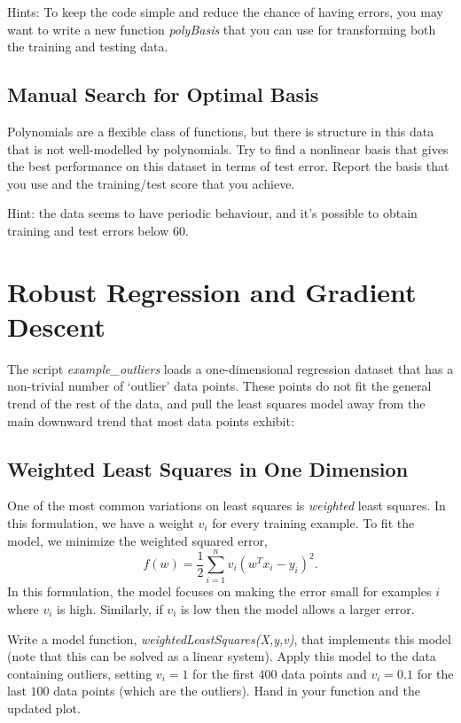 \documentclass{article}
\def\blu#1{{\color{blu}#1}}
\newcommand{\centerfig}[2]{\begin{center}\texttt{[image: a3f/\#2]}\end{center}}
\begin{document}
Hints: To keep the code simple and reduce the chance of having errors, you may want to write a new function \emph{polyBasis} that you can use for transforming both the training and testing data. 



\subsection{Manual Search for Optimal Basis}

Polynomials are a flexible class of functions, but there is structure in this data that is not well-modelled by polynomials. Try to find a nonlinear basis that gives the best performance on this dataset in terms of test error. \blu{Report the basis that you use and the training/test score that you achieve}.

Hint: the data seems to have periodic behaviour, and it's possible to obtain training and test errors below 60.

\section{Robust Regression and Gradient Descent}

The script \emph{example\_outliers} loads a one-dimensional regression dataset that has a non-trivial number of `outlier' data points. These points do not fit the general trend of the rest of the data, and pull the least squares model away from the main downward trend that most data points exhibit:




\subsection{Weighted Least Squares in One Dimension}

One of the most common variations on least squares is \emph{weighted} least squares. In this formulation, we have a weight $v_i$ for every training example. To fit the model, we minimize the weighted squared error,
\[
f(w) =  \frac{1}{2}\sum_{i=1}^n v_i(w^Tx_i - y_i)^2.
\]
In this formulation, the model focuses on making the error small for examples $i$ where $v_i$ is high. Similarly, if $v_i$ is low then the model allows a larger error.

Write a model function, \emph{weightedLeastSquares(X,y,v)}, that implements this model (note that this can be solved as a linear system).
Apply this model to the data containing outliers, setting $v_i = 1$ for the first $400$ data points and $v_i = 0.1$ for the last $100$ data points (which are the outliers). \blu{Hand in your function and the updated plot}.
\end{document}
